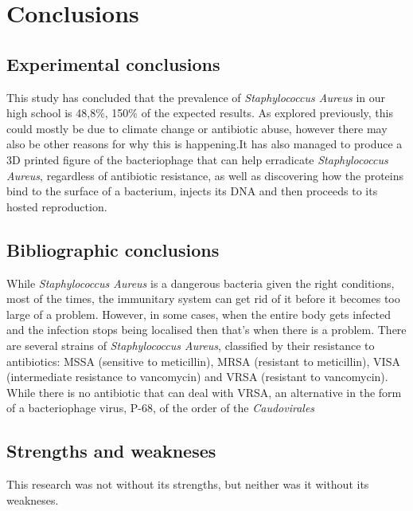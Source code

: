 \chapter{Conclusions}
\section{Experimental conclusions}
This study has concluded that the prevalence of \emph{Staphylococcus Aureus} in our high school is 48,8\%, 150\% of the expected results. As explored previously, this could mostly be due to climate change or antibiotic abuse, however there may also be other reasons for why this is happening.\newline It has also managed to produce a 3D printed figure of the bacteriophage that can help erradicate \emph{Staphylococcus Aureus}, regardless of antibiotic resistance, as well as discovering how the proteins bind to the surface of a bacterium, injects its DNA and then proceeds to its hosted reproduction.
\section{Bibliographic conclusions}
While \emph{Staphylococcus Aureus} is a dangerous bacteria given the right conditions, most of the times, the immunitary system can get rid of it before it becomes too large of a problem. However, in some cases, when the entire body gets infected and the infection stops being localised then that's when there is a problem. There are several strains of \emph{Staphylococcus Aureus}, classified by their resistance to antibiotics: MSSA (sensitive to meticillin), MRSA (resistant to meticillin), VISA (intermediate resistance to vancomycin) and VRSA (resistant to vancomycin). While there is no antibiotic that can deal with VRSA, an alternative in the form of a bacteriophage virus, P-68, of the order of the \emph{Caudovirales}
\section{Strengths and weakneses}
This research was not without its strengths, but neither was it without its weakneses.
